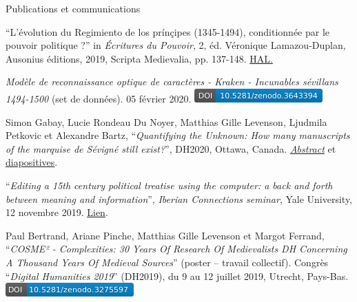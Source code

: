 \begin{rubric}{Publications et communications}
                    
                
                    
                    \entry*
                 \enquote{L'évolution du Regimiento
                        de los prínçipes (1345-1494), conditionnée par le
                        pouvoir politique ?} in \textit{Écritures du Pouvoir}, 2, éd. Véronique
                        Lamazou-Duplan, Ausonius éditions, 2019, Scripta
                        Medievalia, pp. 137-148. \href{https://hal.archives-ouvertes.fr/hal-02369116}{HAL.} 
                    
                    \entry*
                \textit{Modèle de reconnaissance optique de
                        caractères - Kraken - Incunables sévillans
                        1494-1500} (set de données). 05 février 2020.
                        \href{https://zenodo.org/record/3643393}{\includegraphics[scale=0.55]{img/kraken_doi.png}}
            
                    
                    \entry*
                Simon Gabay, Lucie Rondeau Du Noyer, Matthias
                        Gille Levenson, Ljudmila Petkovic et Alexandre Bartz,
                        \enquote{\textit{Quantifying the Unknown: How many manuscripts
                        of the marquise de Sévigné still exist?}},
                        DH2020, Ottawa, Canada. \href{https://hal.archives-ouvertes.fr/hal-02898929/document}{\textit{Abstract}} et \href{http://dx.doi.org/10.17613/2pwa-0f46}{diapositives}.
                    
                    \entry*
                 \enquote{\textit{Editing a 15th century political
                        treatise using the computer: a back and forth between
                        meaning and information}}, \textit{Iberian
                        Connections seminar}, Yale University, 12 novembre
                        2019. \href{https://iberian-connections.yale.edu/articles/editing-a-xvth-century-political-treatise-using-the-computer/}{Lien}.
                    
                    \entry*
                Paul Bertrand, Ariane Pinche, Matthias Gille
                        Levenson et Margot Ferrand, \enquote{\textit{COSME² - Complexities: 30 Years Of Research Of
                        Medievalists DH Concerning A Thousand Years Of Medieval
                        Sources}} (poster -- travail collectif).
                        Congrès \enquote{\textit{Digital Humanities 2019}}
                        (DH2019), du 9 au 12 juillet 2019, Utrecht, Pays-Bas.
                        \href{https://zenodo.org/record/3275597}{\includegraphics[scale=0.55]{img/zenodo3275597.png}}
                    

\end{rubric}
